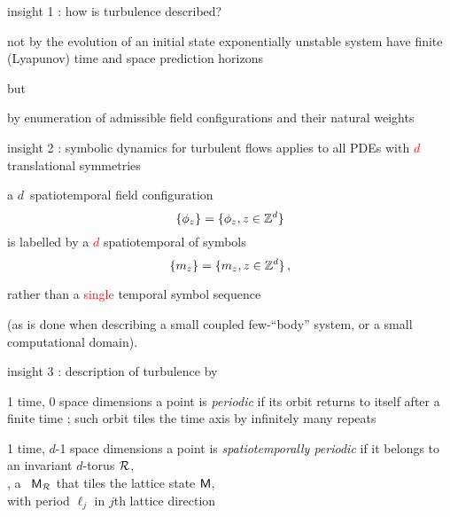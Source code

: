 \begin{frame}{insight 1 : how is turbulence described?}
\begin{block}{not by the evolution of an initial state}
exponentially unstable system have finite (Lyapunov) time and
space prediction horizons
\end{block}
but
\bigskip

\begin{block}{by enumeration of admissible field configurations}
and their natural weights
\end{block}
\end{frame} %

\begin{frame}{insight 2 : symbolic dynamics for turbulent flows}
applies to
all PDEs with \textcolor{red}{$d$} translational symmetries

\bigskip

a $d$\dmn\ spatiotemporal field configuration
\[
\{\phi_{z}\} = \{\phi_{z},  z\in \mathbb{Z}^{d}  \}
\]
is labelled by a \textcolor{red}{$d$\dmn} {spatiotemporal
{\brick}} of symbols
\[
\{m_{z}\} = \{m_{z}, z\in \mathbb{Z}^{d}\}
\,,
\]

\bigskip

rather than a \textcolor{red}{single} temporal symbol sequence

\bigskip

(as is done when describing a small coupled few-``body'' system, or a
small computational domain).
\end{frame} %


\begin{frame}{insight 3 : description of turbulence by \twots}
\begin{block}{1 time, 0 space dimensions}
a {\statesp} point is {\em periodic} if its orbit returns to itself
after a finite time \period{}; such orbit tiles the time axis
by infinitely many repeats
\end{block}

\bigskip

\begin{block}{1 time, $d$-1 space dimensions}
 a {\statesp} point is {\em spatiotemporally periodic} if
it belongs to \\ an invariant $d$-torus ${\mathcal{R}}$,\\
\ie, a \brick\ $\mathsf{M}_{\mathcal{R}}$ that
tiles the lattice state  $\mathsf{M}$, \\
with period $\ell_j$ in $j$th lattice direction
\end{block}
\end{frame} %

